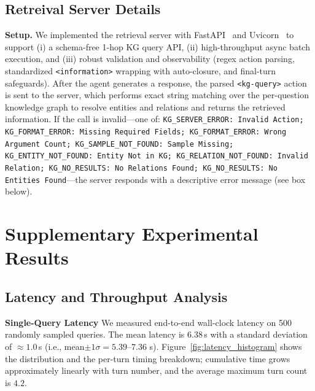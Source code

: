 \subsection{\framework{} Retreival Server Details}
\noindent\textbf{Setup.}
We implemented the \framework{} retrieval server with FastAPI~\citep{fastapi} and Uvicorn~\citep{uvicorn} to support (i) a schema-free 1-hop KG query API, (ii) high-throughput async batch execution, and (iii) robust validation and observability (regex action parsing, standardized \texttt{<information>} wrapping with auto-closure, and final-turn safeguards).
After the \framework{} agent generates a response, the parsed \texttt{<kg-query>} action is sent to the server, which performs exact string matching over the per-question knowledge graph to resolve entities and relations and returns the retrieved information.
If the call is invalid—one of: \texttt{KG\_SERVER\_ERROR: Invalid Action; KG\_FORMAT\_ERROR: Missing Required Fields; KG\_FORMAT\_ERROR: Wrong Argument Count; KG\_SAMPLE\_NOT\_FOUND: Sample Missing; KG\_ENTITY\_NOT\_FOUND: Entity Not in KG; KG\_RELATION\_NOT\_FOUND: Invalid Relation; KG\_NO\_RESULTS: No Relations Found; KG\_NO\_RESULTS: No Entities Found}—the server responds with a descriptive error message (see box below).

\label{Appendix:server_error_messages}


\newpage




\section{Supplementary Experimental Results}
\label{appendix:supplementary_experimental_results}





\subsection{Latency and Throughput Analysis}
\label{appendix:latency_memory_delopyment}

\noindent \textbf{Single-Query Latency}
We measured end-to-end wall-clock latency on 500 randomly sampled  queries. The mean latency is \(6.38\)\,s with a standard deviation of \(\approx 1.0\)\,s (i.e., mean\(\pm 1\sigma = 5.39\text{–}7.36\) s). Figure~\ref{fig:latency_histogram} shows the distribution and the per-turn timing breakdown; cumulative time grows approximately linearly with turn number, and the average maximum turn count is \(4.2\).

